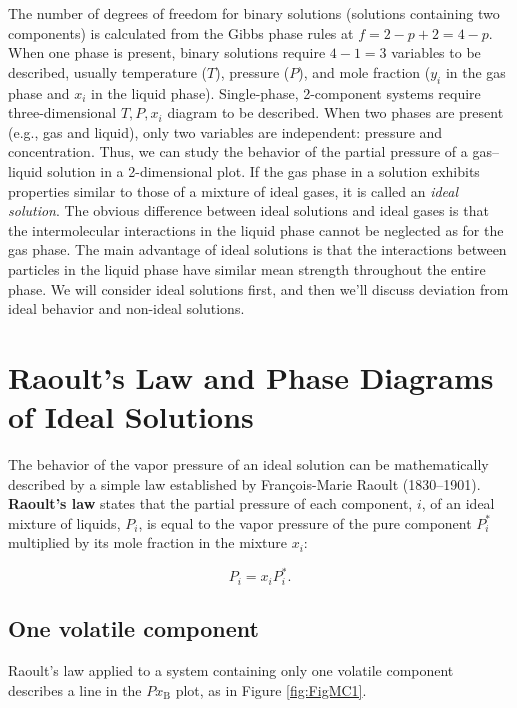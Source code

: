 \documentclass[
  9pt,
]{extbook}
\theoremstyle{definition}
\theoremstyle{definition}
\theoremstyle{definition}
\theoremstyle{definition}
\theoremstyle{remark}
\begin{document}
\normalsize

The number of degrees of freedom for binary solutions (solutions containing two components) is calculated from the Gibbs phase rules at \(f=2-p+2=4-p\). When one phase is present, binary solutions require \(4-1=3\) variables to be described, usually temperature (\(T\)), pressure (\(P\)), and mole fraction (\(y_i\) in the gas phase and \(x_i\) in the liquid phase). Single-phase, 2-component systems require three-dimensional \(T,P,x_i\) diagram to be described. When two phases are present (e.g., gas and liquid), only two variables are independent: pressure and concentration. Thus, we can study the behavior of the partial pressure of a gas--liquid solution in a 2-dimensional plot. If the gas phase in a solution exhibits properties similar to those of a mixture of ideal gases, it is called an \emph{ideal solution}. The obvious difference between ideal solutions and ideal gases is that the intermolecular interactions in the liquid phase cannot be neglected as for the gas phase. The main advantage of ideal solutions is that the interactions between particles in the liquid phase have similar mean strength throughout the entire phase. We will consider ideal solutions first, and then we'll discuss deviation from ideal behavior and non-ideal solutions.

\section{Raoult's Law and Phase Diagrams of Ideal Solutions}\label{raoults-law-and-phase-diagrams-of-ideal-solutions}

The behavior of the vapor pressure of an ideal solution can be mathematically described by a simple law established by François-Marie Raoult (1830--1901). \textbf{Raoult's law} states that the partial pressure of each component, \(i\), of an ideal mixture of liquids, \(P_i\), is equal to the vapor pressure of the pure component \(P_i^*\) multiplied by its mole fraction in the mixture \(x_i\):

\begin{equation}
P_i=x_i P_i^*.
\label{eq:mc1}
\end{equation}

\subsection{One volatile component}\label{one-volatile-component}

Raoult's law applied to a system containing only one volatile component describes a line in the \(Px_{\text{B}}\) plot, as in Figure \ref{fig:FigMC1}.
\end{document}
